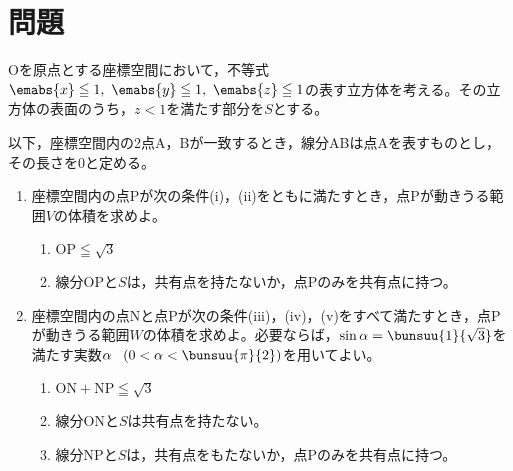 \documentclass[../../../doc/main]{subfiles}
\begin{document}
    \setcounter{chapter}{6}
    \setcounter{section}{1}
    \section{問題}\label{問題6}
        \begin{tcolorbox}
            Oを原点とする座標空間において，不等式$\emabs{x}\leqq1,~\emabs{y}\leqq1,~\emabs{z}\leqq1$の表す立方体を考える。その立方体の表面のうち，$z<1$を満たす部分を$S$とする。\par
            以下，座標空間内の2点A，Bが一致するとき，線分ABは点Aを表すものとし，その長さを0と定める。
            \begin{enumerate}
                \item [\kakkoichi] 
                    座標空間内の点Pが次の条件(i)，(ii)をともに満たすとき，点Pが動きうる範囲$V$の体積を求めよ。
                \begin{enumerate}
                    \item [\tokeiichi] 
                        $\mathrm{OP}\leqq\sqrt{3}$
                    \item [\tokeini] 
                        線分OPと$S$は，共有点を持たないか，点Pのみを共有点に持つ。
                \end{enumerate}
                \item [\kakkoni] 
                    座標空間内の点Nと点Pが次の条件(iii)，(iv)，(v)をすべて満たすとき，点Pが動きうる範囲$W$の体積を求めよ。必要ならば，$\sin{\alpha}=\bunsuu{1}{\sqrt{3}}$を満たす実数$\alpha~~\left(0<\alpha<\bunsuu{\pi}{2}\right)$を用いてよい。
                    \begin{enumerate}
                        \item [\tokeisan]
                            $\mathrm{ON}+\mathrm{NP}\leqq\sqrt{3}$
                        \item [\tokeishi]
                            線分ONと$S$は共有点を持たない。
                        \item [\tokeigo]
                            線分NPと$S$は，共有点をもたないか，点Pのみを共有点に持つ。
                    \end{enumerate}
            \end{enumerate}
        \end{tcolorbox}
\end{document}
